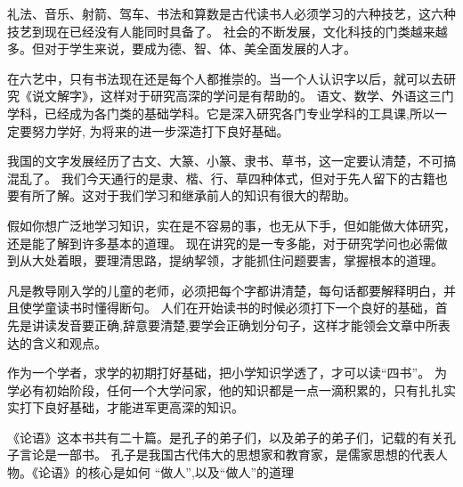 \documentclass[avery5371,grid]{flashcards}
\begin{document}
{礼法、音乐、射箭、驾车、书法和算数是古代读书人必须学习的六种技艺，这六种技艺到现在已经没有人能同时具备了。} %
{社会的不断发展，文化科技的门类越来越多。但对于学生来说，要成为德、智、体、美全面发展的人才。} %

{在六艺中，只有书法现在还是每个人都推崇的。当一个人认识字以后，就可以去研究《说文解字》，这样对于研究高深的学问是有帮助的。} %
{语文、数学、外语这三门学科，已经成为各门类的基础学科。它是深入研究各门专业学科的工具课,所以一定要努力学好, 为将来的进一步深造打下良好基础。} %

{我国的文字发展经历了古文、大篆、小篆、隶书、草书，这一定要认清楚，不可搞混乱了。} %
{我们今天通行的是隶、楷、行、草四种体式，但对于先人留下的古籍也要有所了解。这对于我们学习和继承前人的知识有很大的帮助。} %

{假如你想广泛地学习知识，实在是不容易的事，也无从下手，但如能做大体研究，还是能了解到许多基本的道理。} %
{现在讲究的是一专多能，对于研究学问也必需做到从大处着眼，要理清思路，提纳挈领，才能抓住问题要害，掌握根本的道理。} %



{凡是教导刚入学的儿童的老师，必须把每个字都讲清楚，每句话都要解释明白，并且使学童读书时懂得断句。} %
{人们在开始读书的时候必须打下一个良好的基础，首先是讲读发音要正确,辞意要清楚,要学会正确划分句子，这样才能领会文章中所表达的含义和观点。} %

{作为一个学者，求学的初期打好基础，把小学知识学透了，才可以读“四书”。} %
{为学必有初始阶段，任何一个大学问家，他的知识都是一点一滴积累的，只有扎扎实实打下良好基础，才能进军更高深的知识。} %

{《论语》这本书共有二十篇。是孔子的弟子们，以及弟子的弟子们，记载的有关孔子言论是一部书。} %
{孔子是我国古代伟大的思想家和教育家，是儒家思想的代表人物。《论语》的核心是如何 “做人”,以及“做人”的道理} %
\end{document}
